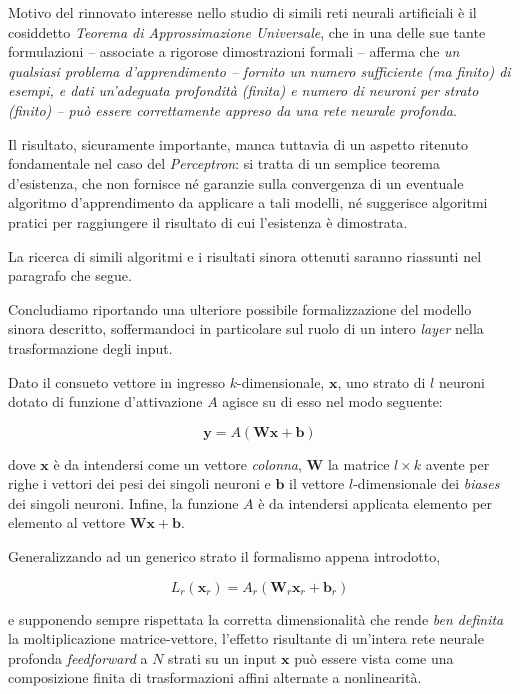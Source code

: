 \documentclass[a4paper, twoside]{article}
\begin{document}
Motivo del rinnovato interesse nello studio di simili reti neurali artificiali è il cosiddetto \textit{Teorema di Approssimazione Universale}, che in una delle sue tante formulazioni -- associate a rigorose dimostrazioni formali -- afferma che \textit{un qualsiasi problema d'apprendimento -- fornito un numero sufficiente (ma finito) di esempi, e dati un'adeguata profondità (finita) e numero di neuroni per strato (finito) -- può essere correttamente appreso da una rete neurale profonda}.

Il risultato, sicuramente importante, manca tuttavia di un aspetto ritenuto fondamentale nel caso del \textit{Perceptron}: si tratta di un semplice teorema d'esistenza, che non fornisce né garanzie sulla convergenza di un eventuale algoritmo d'apprendimento da applicare a tali modelli, né suggerisce algoritmi pratici per raggiungere il risultato di cui l'esistenza è dimostrata.

La ricerca di simili algoritmi e i risultati sinora ottenuti saranno riassunti nel paragrafo che segue.

Concludiamo riportando una ulteriore possibile formalizzazione del modello sinora descritto, soffermandoci in particolare sul ruolo di un intero \textit{layer} nella trasformazione degli input.

Dato il consueto vettore in ingresso $k$-dimensionale, $\boldsymbol{x}$, uno strato di $l$ neuroni dotato di funzione d'attivazione $A$ agisce su di esso nel modo seguente:

$$
\boldsymbol{y} = A\left(  \boldsymbol{W} \boldsymbol{x} + \boldsymbol{b} \right)
$$

dove $\boldsymbol{x}$ è da intendersi come un vettore \textit{colonna}, $\boldsymbol{W}$ la matrice $l \times k$ avente per righe i vettori dei pesi dei singoli neuroni e $\boldsymbol{b}$ il vettore $l$-dimensionale dei \textit{biases} dei singoli neuroni. Infine, la funzione $A$ è da intendersi applicata elemento per elemento al vettore $\boldsymbol{W} \boldsymbol{x} + \boldsymbol{b}$.

Generalizzando ad un generico strato il formalismo appena introdotto,

$$
L_r(\boldsymbol{x}_r) = A_r\left(  \boldsymbol{W}_r \boldsymbol{x}_r + \boldsymbol{b}_r \right)
$$

e supponendo sempre rispettata la corretta dimensionalità che rende \textit{ben definita} la moltiplicazione matrice-vettore, l'effetto risultante di un'intera rete neurale profonda \textit{feedforward} a $N$ strati su un input $\boldsymbol{x}$ può essere vista come una composizione finita di trasformazioni affini alternate a nonlinearità.
\end{document}
